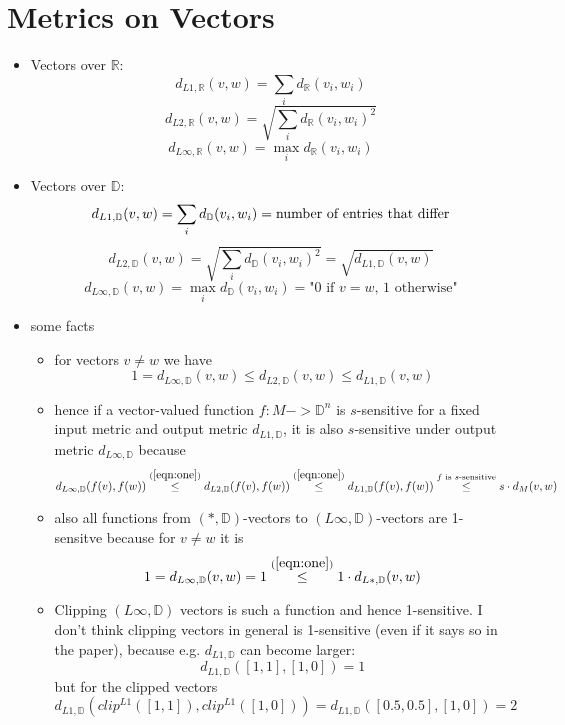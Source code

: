 \documentclass{article}
\begin{document}
\section*{Metrics on Vectors}
\begin{itemize}
   \item Vectors over $\mathbb{R}$:
      \[  d_{L1,\mathbb{R}}(v,w) = \sum_i d_\mathbb{R}(v_i, w_i) \]
      \[  d_{L2,\mathbb{R}}(v,w) = \sqrt{\sum_i d_\mathbb{R}(v_i, w_i)^2} \]
      \[  d_{L\infty,\mathbb{R}}(v,w) = \max_i d_\mathbb{R}(v_i, w_i) \]
   \item Vectors over $\mathbb{D}$:
      \[  d_{L1,\mathbb{D}}(v,w) = \sum_i d_\mathbb{D}(v_i, w_i) = \textnormal{number of entries that differ} \]
      \[  d_{L2,\mathbb{D}}(v,w) = \sqrt{\sum_i d_\mathbb{D}(v_i, w_i)^2} = \sqrt{d_{L1,\mathbb{D}}(v,w) } \]
      \[  d_{L\infty,\mathbb{D}}(v,w) = \max_i d_\mathbb{D}(v_i, w_i) = \text{"} 0 \text{ if } v=w \text{, 1 otherwise"} \]
   \item some facts
      \begin{itemize}
         \item for vectors $v\neq w$ we have
               \begin{equation}
                   \label{eqn:one}
                    1 = d_{{L\infty},\mathbb{D}}(v,w) \leq d_{L2,\mathbb{D}}(v,w) \leq d_{L1,\mathbb{D}}(v,w)
               \end{equation}
         \item hence if a vector-valued function $f:M->\mathbb{D}^n$ is $s$-sensitive for a fixed input metric and output metric $d_{L1,\mathbb{D}}$, it is also $s$-sensitive under output metric $d_{L\infty,\mathbb{D}}$ because
         \[d_{L\infty,\mathbb{D}}(f(v),f(w))\overset{(\ref{eqn:one})}{\leq} d_{L2,\mathbb{D}}(f(v),f(w)) \overset{(\ref{eqn:one})}{\leq} d_{L1,\mathbb{D}}(f(v),f(w)) \overset{f \textnormal{ is $s$-sensitive}}{\leq} s \cdot d_M(v,w)\]
         \item also all functions from $(*,\mathbb{D})$-vectors to $(L\infty,\mathbb{D})$-vectors are 1-sensitve because for $v \neq w$ it is
         \[1 = d_{L\infty, \mathbb{D}}(v,w) = 1 \overset{(\ref{eqn:one})}{\leq} 1 \cdot d_{L*, \mathbb{D}}(v,w)\]
         \item Clipping $(L\infty,\mathbb{D})$ vectors is such a function and hence 1-sensitive. I don't think clipping vectors in general is 1-sensitive (even if it says so in the paper), because e.g. $d_{L1,\mathbb{D}}$ can become larger:
            $$d_{L1,\mathbb{D}}([1,1],[1,0]) = 1$$
            but for the clipped vectors 
            $$d_{L1,\mathbb{D}}(clip^{L1}([1,1]), clip^{L1}([1,0])) = d_{L1,\mathbb{D}}([0.5,0.5],[1,0]) = 2$$
      \end{itemize}
\end{itemize}
\end{document}
